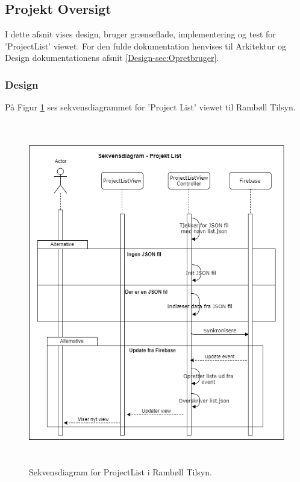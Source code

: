 \subsection{Projekt Oversigt}
I dette afsnit vises design, bruger grænseflade, implementering og test for 'ProjectList' viewet. For den fulde dokumentation henvises til Arkitektur og Design dokumentationens afsnit \ref{Design-sec:Opretbruger}.

\subsubsection{Design}
På Figur \ref{fig:ProjctListSekvens} ses sekvensdiagrammet for 'Project List' viewet til Rambøll Tilsyn.
\begin{figure}[H] %
	\centering
	\includegraphics[height=15cm, width=12cm]{../ArkitekturDesign/Design/ProjectList/ProjektListSekvensDiagram}
	\caption{Sekvensdiagram for ProjectList i Rambøll Tilsyn.}
	\label{fig:ProjctListSekvens}
\end{figure}

\clearpage

